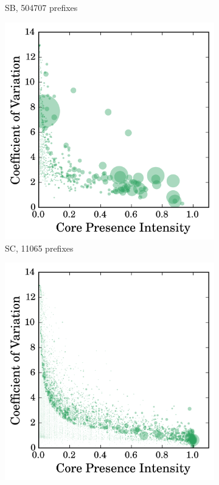 \begin{figure}
\begin{subfigure}[b]{0.49\textwidth}
                \caption{SB, 504707 prefixes}
                \label{fig:cv_cp_sb}
        \end{subfigure}
        \begin{subfigure}[b]{0.49\textwidth}
                \includegraphics[width=\textwidth]{gfx/chap2/corre_cv_cp_sc.png}
                \caption{SC, 11065 prefixes}
                \label{fig:cv_cp_sc}
        \end{subfigure}
        \begin{subfigure}[b]{0.49\textwidth}
                \includegraphics[width=\textwidth]{gfx/chap2/corre_cv_cp_sd.png}

\end{subfigure}
\end{figure}

